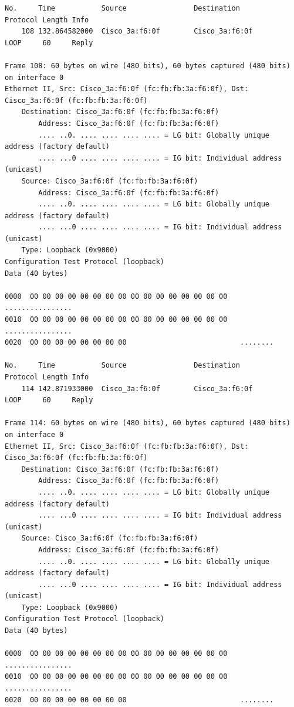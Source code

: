 \documentclass[a4paper,11pt]{article}
\begin{document}
\begin{lstlisting}
No.     Time           Source                Destination           Protocol Length Info
    108 132.864582000  Cisco_3a:f6:0f        Cisco_3a:f6:0f        LOOP     60     Reply

Frame 108: 60 bytes on wire (480 bits), 60 bytes captured (480 bits) on interface 0
Ethernet II, Src: Cisco_3a:f6:0f (fc:fb:fb:3a:f6:0f), Dst: Cisco_3a:f6:0f (fc:fb:fb:3a:f6:0f)
    Destination: Cisco_3a:f6:0f (fc:fb:fb:3a:f6:0f)
        Address: Cisco_3a:f6:0f (fc:fb:fb:3a:f6:0f)
        .... ..0. .... .... .... .... = LG bit: Globally unique address (factory default)
        .... ...0 .... .... .... .... = IG bit: Individual address (unicast)
    Source: Cisco_3a:f6:0f (fc:fb:fb:3a:f6:0f)
        Address: Cisco_3a:f6:0f (fc:fb:fb:3a:f6:0f)
        .... ..0. .... .... .... .... = LG bit: Globally unique address (factory default)
        .... ...0 .... .... .... .... = IG bit: Individual address (unicast)
    Type: Loopback (0x9000)
Configuration Test Protocol (loopback)
Data (40 bytes)

0000  00 00 00 00 00 00 00 00 00 00 00 00 00 00 00 00   ................
0010  00 00 00 00 00 00 00 00 00 00 00 00 00 00 00 00   ................
0020  00 00 00 00 00 00 00 00                           ........

No.     Time           Source                Destination           Protocol Length Info
    114 142.871933000  Cisco_3a:f6:0f        Cisco_3a:f6:0f        LOOP     60     Reply

Frame 114: 60 bytes on wire (480 bits), 60 bytes captured (480 bits) on interface 0
Ethernet II, Src: Cisco_3a:f6:0f (fc:fb:fb:3a:f6:0f), Dst: Cisco_3a:f6:0f (fc:fb:fb:3a:f6:0f)
    Destination: Cisco_3a:f6:0f (fc:fb:fb:3a:f6:0f)
        Address: Cisco_3a:f6:0f (fc:fb:fb:3a:f6:0f)
        .... ..0. .... .... .... .... = LG bit: Globally unique address (factory default)
        .... ...0 .... .... .... .... = IG bit: Individual address (unicast)
    Source: Cisco_3a:f6:0f (fc:fb:fb:3a:f6:0f)
        Address: Cisco_3a:f6:0f (fc:fb:fb:3a:f6:0f)
        .... ..0. .... .... .... .... = LG bit: Globally unique address (factory default)
        .... ...0 .... .... .... .... = IG bit: Individual address (unicast)
    Type: Loopback (0x9000)
Configuration Test Protocol (loopback)
Data (40 bytes)

0000  00 00 00 00 00 00 00 00 00 00 00 00 00 00 00 00   ................
0010  00 00 00 00 00 00 00 00 00 00 00 00 00 00 00 00   ................
0020  00 00 00 00 00 00 00 00                           ........


\end{lstlisting}
\end{document}
